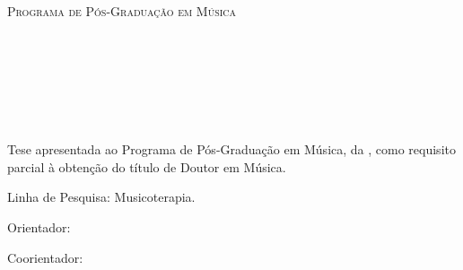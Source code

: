 

\begin{center}
    \textsc{\instituicao}\\
    \textsc{\centro}\\
    \textsc{Programa de Pós-Graduação em Música}

    \vspace{4.5cm}
\autor\

    \begin{center}

    \vspace*{\fill} %
   \textbf{\titulo}
    \vspace*{\fill} %
    \end{center}

    \vfill
    \cidade\ \\
    \ano\
\end{center}
\thispagestyle{empty} %
\newpage

\vspace{1cm}	

\begin{center}	
\textsc{\titulo}
\end{center}

\vspace{4.5cm}	

\begin{center}
\autor\
\end{center}

\begin{center}
    \vspace*{\fill} %
\hfill \parbox{8.5cm} 
{\noindent
Tese apresentada ao Programa de Pós-Graduação em Música, da \instituicao, como requisito parcial à obtenção do título de Doutor em Música.

\par{Linha de Pesquisa: Musicoterapia.}

\vspace{0.5cm}
Orientador: \orientador{}
\par Coorientador: \coorientador{}
}
\vfill

    \vspace*{\fill} %
\end{center}

\begin{center}
\cidade\ \\
\ano\
\end{center}

\thispagestyle{empty} %
\newpage\
